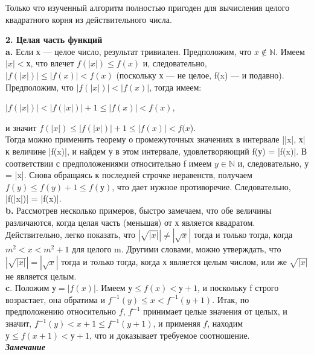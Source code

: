 \begin{mynotice}
Только что изученный алгоритм полностью пригоден для вычисления целого квадратного корня из действительного числа.
\end{mynotice}
\newpage

\noindent
\textbf{2. Целая часть функций}\\

\textbf{a.} Если х — целое число, результат тривиален. Предположим, что $x\notin \mathbb{N}$. Имеем $|x| < х$, что влечет $f(|x|) \leqslant f(x)$ и, следовательно, $|f(|x|)| \leqslant |f(x)| < f(x)$ (поскольку х — не целое, f(x) — и подавно). Предположим, что $|f(|x|)| < |f(x)|$, тогда имеем:
\begin{center}
$|f(|x|)| < |f(|x|)| + 1 \leqslant |f(x)| < f(x)$,
\end{center}
\hspace*{100pt}и значит $f(|x|) \leqslant |f(|x|)| + 1 \leqslant |f(x)| < f(x$).\\

\noindent
Тогда можно применить теорему о промежуточных значениях в интервале ||x|, х| к величине |f(x)|, и найдем у в этом интервале, удовлетворяющий f(у) = |f(x)|. В соответствии с предположениями относительно f имеем $y \in \mathbb{N}$ и, следовательно, у = |x|. Снова обращаясь к последней строчке неравенств, получаем $f(y) \leqslant f(y) + 1 \leqslant f(у)$, что дает нужное противоречие. Следовательно, |f(|x|)| = |f(x)|.\\

\textbf{b.} Рассмотрев несколько примеров, быстро замечаем, что обе величины различаются, когда целая часть (меньшая) от х является квадратом. Действительно, легко показать, что $|\sqrt{|x|}| \neq |\sqrt{x}|$ тогда и только тогда, когда $m^{2} < x < m^{2} + 1$ для целого m. Другими словами, можно утверждать, что $|\sqrt{|x|}| = |\sqrt{x}|$ тогда и только тогда, когда х является целым числом, или же $\sqrt{|x|}$ не является целым.\\

\textbf{c}. Положим $у = |f(x)|$. Имеем $у \leqslant  f(x) < у + 1$, и поскольку f строго возрастает, она обратима и $f^{-1}(y) \leqslant x < f^{-1}(y + 1)$. Итак, по предположению относительно $f$, $f^{-1}$ принимает целые значения от целых, и значит, $f^{-1}(y) < x + 1 \leqslant f^{-1}(y + 1)$, и применяя $f$, находим $у \leqslant f(x+1) < у + 1$, что и доказывает требуемое соотношение.\\

\textit{\textbf{Замечание}}\\

